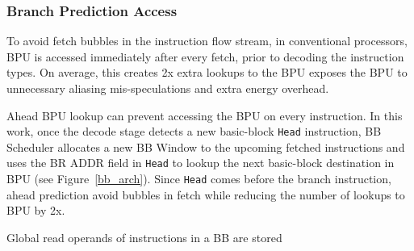 \subsubsection{Branch Prediction Access}

To avoid fetch bubbles in the instruction flow stream, in conventional
processors, BPU is accessed immediately after every fetch, prior to decoding the
instruction types. On average, this creates 2x extra lookups to the BPU exposes
the BPU to unnecessary aliasing mis-speculations and extra energy overhead.

Ahead BPU lookup can prevent accessing the BPU on every instruction. In this
work, once the decode stage detects a new basic-block \texttt{Head} instruction,
    BB Scheduler allocates a new BB Window to the upcoming fetched instructions
    and uses the BR ADDR field in \texttt{Head} to lookup the next basic-block
    destination in BPU (see Figure~\ref{bb_arch}). Since \texttt{Head} comes
    before the branch instruction, ahead prediction avoid bubbles in fetch while
    reducing the number of lookups to BPU by 2x.


Global read operands of instructions in a BB are stored 
